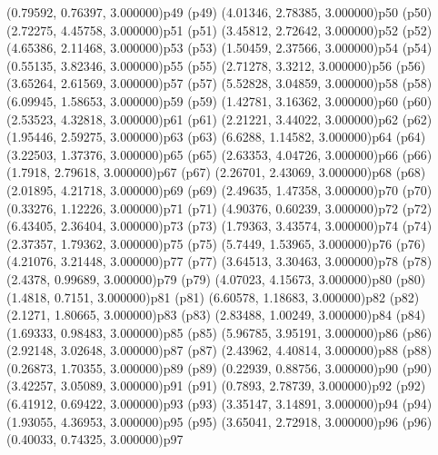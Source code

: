 \psPoint(0.79592, 0.76397, 3.000000){p49}
\psdot(p49)
\psPoint(4.01346, 2.78385, 3.000000){p50}
\psdot(p50)
\psPoint(2.72275, 4.45758, 3.000000){p51}
\psdot(p51)
\psPoint(3.45812, 2.72642, 3.000000){p52}
\psdot(p52)
\psPoint(4.65386, 2.11468, 3.000000){p53}
\psdot(p53)
\psPoint(1.50459, 2.37566, 3.000000){p54}
\psdot(p54)
\psPoint(0.55135, 3.82346, 3.000000){p55}
\psdot(p55)
\psPoint(2.71278, 3.3212, 3.000000){p56}
\psdot(p56)
\psPoint(3.65264, 2.61569, 3.000000){p57}
\psdot(p57)
\psPoint(5.52828, 3.04859, 3.000000){p58}
\psdot(p58)
\psPoint(6.09945, 1.58653, 3.000000){p59}
\psdot(p59)
\psPoint(1.42781, 3.16362, 3.000000){p60}
\psdot(p60)
\psPoint(2.53523, 4.32818, 3.000000){p61}
\psdot(p61)
\psPoint(2.21221, 3.44022, 3.000000){p62}
\psdot(p62)
\psPoint(1.95446, 2.59275, 3.000000){p63}
\psdot(p63)
\psPoint(6.6288, 1.14582, 3.000000){p64}
\psdot(p64)
\psPoint(3.22503, 1.37376, 3.000000){p65}
\psdot(p65)
\psPoint(2.63353, 4.04726, 3.000000){p66}
\psdot(p66)
\psPoint(1.7918, 2.79618, 3.000000){p67}
\psdot(p67)
\psPoint(2.26701, 2.43069, 3.000000){p68}
\psdot(p68)
\psPoint(2.01895, 4.21718, 3.000000){p69}
\psdot(p69)
\psPoint(2.49635, 1.47358, 3.000000){p70}
\psdot(p70)
\psPoint(0.33276, 1.12226, 3.000000){p71}
\psdot(p71)
\psPoint(4.90376, 0.60239, 3.000000){p72}
\psdot(p72)
\psPoint(6.43405, 2.36404, 3.000000){p73}
\psdot(p73)
\psPoint(1.79363, 3.43574, 3.000000){p74}
\psdot(p74)
\psPoint(2.37357, 1.79362, 3.000000){p75}
\psdot(p75)
\psPoint(5.7449, 1.53965, 3.000000){p76}
\psdot(p76)
\psPoint(4.21076, 3.21448, 3.000000){p77}
\psdot(p77)
\psPoint(3.64513, 3.30463, 3.000000){p78}
\psdot(p78)
\psPoint(2.4378, 0.99689, 3.000000){p79}
\psdot(p79)
\psPoint(4.07023, 4.15673, 3.000000){p80}
\psdot(p80)
\psPoint(1.4818, 0.7151, 3.000000){p81}
\psdot(p81)
\psPoint(6.60578, 1.18683, 3.000000){p82}
\psdot(p82)
\psPoint(2.1271, 1.80665, 3.000000){p83}
\psdot(p83)
\psPoint(2.83488, 1.00249, 3.000000){p84}
\psdot(p84)
\psPoint(1.69333, 0.98483, 3.000000){p85}
\psdot(p85)
\psPoint(5.96785, 3.95191, 3.000000){p86}
\psdot(p86)
\psPoint(2.92148, 3.02648, 3.000000){p87}
\psdot(p87)
\psPoint(2.43962, 4.40814, 3.000000){p88}
\psdot(p88)
\psPoint(0.26873, 1.70355, 3.000000){p89}
\psdot(p89)
\psPoint(0.22939, 0.88756, 3.000000){p90}
\psdot(p90)
\psPoint(3.42257, 3.05089, 3.000000){p91}
\psdot(p91)
\psPoint(0.7893, 2.78739, 3.000000){p92}
\psdot(p92)
\psPoint(6.41912, 0.69422, 3.000000){p93}
\psdot(p93)
\psPoint(3.35147, 3.14891, 3.000000){p94}
\psdot(p94)
\psPoint(1.93055, 4.36953, 3.000000){p95}
\psdot(p95)
\psPoint(3.65041, 2.72918, 3.000000){p96}
\psdot(p96)
\psPoint(0.40033, 0.74325, 3.000000){p97}
